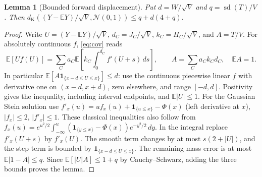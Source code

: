 \documentclass[11pt]{article}
\newtheorem{lemma}[theorem]{Lemma}
\newcommand{\E}{\mathbb E}
\newcommand{\ind}{\mathbf1}
\newcommand{\dK}{d_{\mathrm K}}
\newcommand{\Nlaw}{\mathcal N(0,1)}
\newcommand{\sd}{\operatorname{sd}}
\numberwithin{equation}{section}
\begin{document}
\begin{lemma}[Bounded forward displacement]\label{lem:stein}
Put $d=W/\sqrt V$ and $q=\sd(T)/V$. Then
$\dK((Y-\E Y)/\sqrt V,\Nlaw)\le q+d(4+q)$.
\end{lemma}
\begin{proof}
Write $U=(Y-\E Y)/\sqrt V$, $d_C=J_C/\sqrt V$, $k_C=H_C/\sqrt V$, and $A=T/V$.
For absolutely continuous $f$, \eqref{eq:cov} reads
\[
 \E[Uf(U)]=\sum_C a_C\E\left[k_C\int_0^{d_C} f'(U+s)\,ds\right],
 \qquad A=\sum_C a_C k_Cd_C,\quad \E A=1.
\]
In particular $\E[A\ind_{\{x-d\le U\le x\}}]\le d$: use the continuous
piecewise linear $f$ with derivative one on $(x-d,x+d)$, zero elsewhere,
and range $[-d,d]$. Positivity gives the inequality, including interval endpoints, and
$\E|U|\le1$. For the Gaussian Stein solution use
$f'_x(u)=u f_x(u)+\ind_{\{u\le x\}}-\Phi(x)$ (left derivative at $x$),
$|f_x|\le2$, $|f'_x|\le1$. These classical inequalities also follow from
$f_x(u)=e^{u^2/2}\int_{-\infty}^u(\ind_{\{y\le x\}}-\Phi(x))e^{-y^2/2}\,dy$.
In the integral replace $f'_x(U+s)$ by $f'_x(U)$. The smooth term changes by at most
$s(2+|U|)$, and the step term is bounded by $\ind_{\{x-d\le U\le x\}}$.
The remaining mass error is at most $\E|1-A|\le q$. Since
$\E[|U|A]\le1+q$ by Cauchy--Schwarz, adding the three bounds proves the lemma.
\end{proof}
\end{document}
